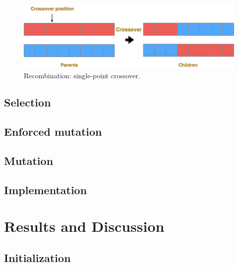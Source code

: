 \documentclass{article} %
\begin{document}
\begin{figure}[h]
\begin{center}
\includegraphics[scale=0.3]{recombination.jpg}
\end{center}
\caption{Recombination: single-point crossover.}
\label{fig:recombination}
\end{figure}

\subsection{Selection}

\subsection{Enforced mutation}

\subsection{Mutation}

\subsection{Implementation}



\section{Results and Discussion}

\subsection{Initialization}
\end{document}
